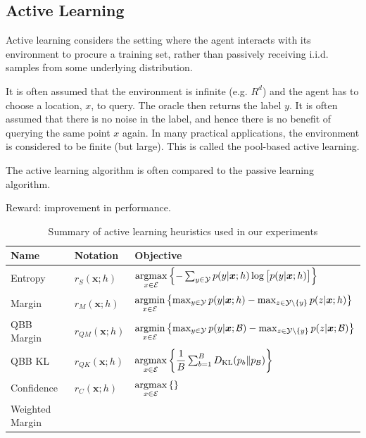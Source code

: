 \documentclass[fleqn,10pt,lineno]{wlpeerj} %
\newcommand{\B}{\mathcal{B}}
\newcommand{\Y}{\mathcal{Y}}
\newcommand{\Ecal}{\mathcal{E}}
\newcommand*{\argmin}{\operatornamewithlimits{argmin}\limits}
\newcommand*{\argmax}{\operatornamewithlimits{argmax}\limits}
\begin{document}
\subsection*{Active Learning}

Active learning considers the setting where the agent interacts with
its environment to procure a training set, rather than passively
receiving i.i.d. samples from some underlying distribution.

It is often assumed that the environment is infinite (e.g. $R^d$) and
the agent has to choose a location, $x$, to query. The oracle then returns
the label $y$. It is often assumed that there is no noise in the label,
and hence there is no benefit of querying the same point $x$ again. In
many practical applications, the environment is considered to be
finite (but large). This is called the pool-based active learning.

The active learning algorithm is often compared to the passive
learning algorithm.

Reward: improvement in performance.

\begin{table}[h]
	\caption {Summary of active learning heuristics used in our experiments} \label{tab:heuristics}
	\centering
	\begin{tabular}{lll}
		\toprule
		{Name}  & Notation &  Objective  \\
		\midrule
		Entropy & $r_S(\bm{x}; h)$
			& $\argmax_{x \in \Ecal} \left\{-\sum_{y \in \Y} p(y | \bm{x}; h)
            \log \big[ p(y | \bm{x}; h) \big] \right\}$
			\\[2ex]
		Margin & $r_M(\bm{x}; h)$
			& $\argmin_{x \in \Ecal} \left\{ \max_{y \in \Y} p(y | \bm{x}; h) -
            \max_{z \in \Y \setminus \{y\}} p(z | \bm{x}; h)  \right\}$
			\\[2ex]
		QBB Margin & $r_{QM}(\bm{x}; h)$
			& $\argmin_{x \in \Ecal} \left\{ \max_{y \in \Y} p(y | \bm{x}; \B) -
            \max_{z \in \Y \setminus \{y\}} p(z | \bm{x}; \B)  \right\}$
			\\[2ex]
		QBB KL & $r_{QK}(\bm{x}; h)$
			& $\argmax_{x \in \Ecal} \left\{ \dfrac{1}{B}
               \sum_{b=1}^B D_{\mathrm{KL}}(p_b\|p_\B) \right\}$
			\\
        Confidence & $r_{C}(\bm{x}; h)$
			& $\argmax_{x \in \Ecal} \left\{   \right\}$
			\\
        Weighted Margin &
			&
			\\
		\bottomrule
	\end{tabular}
\end{table}
\end{document}
